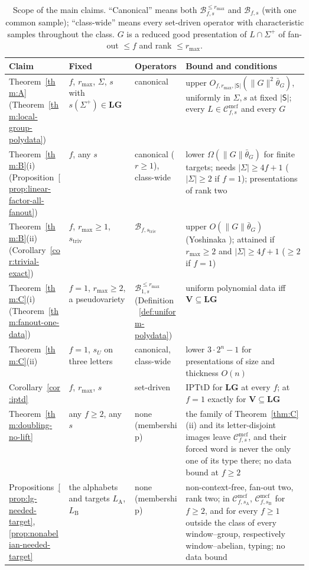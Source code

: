 \documentclass[11pt]{article}
\numberwithin{equation}{section}
\theoremstyle{plain}
\theoremstyle{definition}
\theoremstyle{remark}
\newcommand{\Cmcf}[2]{\mathcal{C}^{\mathrm{mcf}}_{#1,#2}}
\theoremstyle{plain}
\begin{document}
\begin{table}[htbp]
\caption{Scope of the main claims.  ``Canonical'' means both
$\mathcal B^{\le r_{\max}}_{f,s}$ and $\mathcal B_{f,s}$ (with one common sample);
``class-wide'' means every set-driven operator with characteristic samples
throughout the class.  $G$ is a reduced good presentation of $L\cap\Sigma^+$ of
fan-out $\le f$ and rank $\le r_{\max}$.}
\label{tab:scope}
\centering
\footnotesize
\setlength{\tabcolsep}{3pt}
\renewcommand{\arraystretch}{1.04}
\begin{tabularx}{\linewidth}{@{}>{\raggedright\arraybackslash}p{0.2\linewidth}>{\raggedright\arraybackslash}p{0.22\linewidth}>{\raggedright\arraybackslash}p{0.17\linewidth}>{\raggedright\arraybackslash}X@{}}
\hline
Claim & Fixed & Operators & Bound and conditions\\
\hline
Theorem~\ref{thm:A} (Theorem~\ref{thm:local-group-polydata})
 & $f$, $r_{\max}$, $\Sigma$, $s$ with $s(\Sigma^+)\in\mathbf{LG}$
 & canonical
 & upper $O_{f,r_{\max},|\mathsf S|}(\|G\|^2\bar\theta_G)$, uniformly
    in $\Sigma,s$ at fixed $|\mathsf S|$; every $L\in\Cmcf{f}{s}$ and every $G$\\
Theorem~\ref{thm:B}(i) (Proposition~\ref{prop:linear-factor-all-fanout})
 & $f$, any $s$
 & canonical ($r\ge1$), class-wide
 & lower $\Omega(\|G\|\bar\theta_G)$ for finite targets; needs $|\Sigma|\ge4f+1$ ($|\Sigma|\ge2$ if $f=1$);
   presentations of rank two\\
Theorem~\ref{thm:B}(ii) (Corollary~\ref{cor:trivial-exact})
 & $f$, $r_{\max}\ge1$, $s_{\mathrm{triv}}$
 & $\mathcal B_{f,s_{\mathrm{triv}}}$
 & upper $O(\|G\|\bar\theta_G)$ (Yoshinaka \cite{Yoshinaka2011}); attained if $r_{\max}\ge2$ and $|\Sigma|\ge4f+1$ ($\ge2$ if $f=1$)\\
Theorem~\ref{thm:C}(i) (Theorem~\ref{thm:fanout-one-data})
 & $f=1$, $r_{\max}\ge2$, a pseudovariety
 & $\mathcal B^{\le r_{\max}}_{1,s}$ (Definition~\ref{def:uniform-polydata})
 & uniform polynomial data iff $\mathbf V\subseteq\mathbf{LG}$\\
Theorem~\ref{thm:C}(ii)
  & $f=1$, $s_U$ on three letters
 & canonical, class-wide
 & lower $3\cdot2^n-1$ for presentations of size and thickness $O(n)$\\
Corollary~\ref{cor:iptd}
 & $f$, $r_{\max}$, $s$
 & set-driven
 & IPTtD for $\mathbf{LG}$ at every $f$; at $f=1$ exactly for $\mathbf{V}\subseteq\mathbf{LG}$\\
Theorem~\ref{thm:doubling-no-lift}
 & any $f\ge2$, any $s$
 & none (membership)
  & the family of Theorem~\ref{thm:C}(ii) and its letter-disjoint images leave $\Cmcf{f}{s}$, and their forced word is never the only one of its type there; no data bound at $f\ge2$\\
Propositions~\ref{prop:lg-needed-target}, \ref{prop:nonabelian-needed-target}
 & the alphabets and targets $L_{\mathrm A}$, $L_{\mathrm B}$
 & none (membership)
 & non-context-free, fan-out two, rank two; in $\Cmcf{f}{s_{\mathrm A}}$, $\Cmcf{f}{s_{\mathrm B}}$ for $f\ge2$, and for every $f\ge1$ outside the class of every window--group, respectively window--abelian, typing; no data bound\\
\hline
\end{tabularx}
\end{table}
\end{document}
